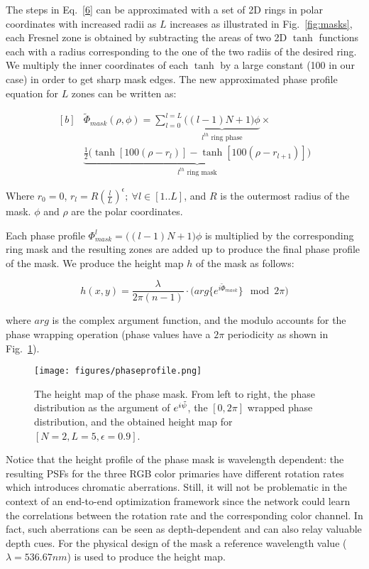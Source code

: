 \documentclass[preprint,5p,twocolumn]{elsarticle}
\begin{document}
The steps in Eq.~\ref{6} can be approximated with a set of 2D rings in polar coordinates with increased radii as $L$ increases as illustrated in Fig.~\ref{fig:masks}, each Fresnel zone is obtained by subtracting the areas of two 2D $\tanh$ functions each with a radius corresponding to the one of the two radiis of the desired ring. We multiply the inner coordinates of each $\tanh$ by a large constant (100 in our case) in order to get sharp mask edges. The new approximated phase profile equation for $L$ zones can be written as:

\begin{equation}
\begin{aligned}[b]
    & \tilde{\Phi}_{mask}(\rho,\phi)= \sum_{l=0}^{l=L}\underbrace{\bigr((l-1)N+1\bigl) \phi}_\text{$l^{th}$ ring phase} \times {}\\ &\underbrace{\frac{1}{2}\bigr(\tanh[100(\rho-r_{l})]-\tanh[100(\rho-r_{l+1})]\bigl)}_\text{$l^{th}$ ring mask}
    \end{aligned}
\end{equation}

Where $r_{0}=0$, $r_{l}=R(\frac{l}{L})^\epsilon ; ~\forall l\in[1..L]$, and $R$ is the outermost radius of the mask. $\phi$ and $\rho$ are the polar coordinates.

Each phase profile $\Phi_{mask}^{l}=\bigr((l-1)N+1\bigl)\phi$ is multiplied by the corresponding ring mask and the resulting zones are added up to produce the final phase profile of the mask. We produce the height map $h$ of the mask as follows:

\begin{equation}
    h(x,y)=\frac{\lambda}{2\pi(n-1)}\cdot  \bigr(arg\{e^{i\tilde{\Phi}_{mask}}\} \mod 2\pi\bigl)
\end{equation}

where $arg$ is the complex argument function, and the modulo accounts for the phase wrapping operation (phase values have a $2\pi$ periodicity as shown in  Fig.~\ref{fig:height}).

\begin{figure}[h!]
    \centering
    \texttt{[image: figures/phaseprofile.png]}
    \caption{The height map of the phase mask. From left to right, the phase distribution as the argument of $e^{i\Tilde{\psi}}$, the $[0,2\pi]$ wrapped phase distribution, and the obtained height map for $[N=2,L=5,\epsilon=0.9]$.}
    \label{fig:height}
\end{figure}

Notice that the height profile of the phase mask is wavelength dependent: the resulting PSFs for the three RGB color primaries have different rotation rates which introduces chromatic aberrations. Still, it will not be problematic in the context of an end-to-end optimization framework since the network could learn the correlations between the rotation rate and the corresponding color channel. In fact, such aberrations can be seen as depth-dependent and can also relay valuable depth cues. For the physical design of the mask a reference wavelength value ($\lambda= 536.67 nm$) is used to produce the height map. 
\end{document}
